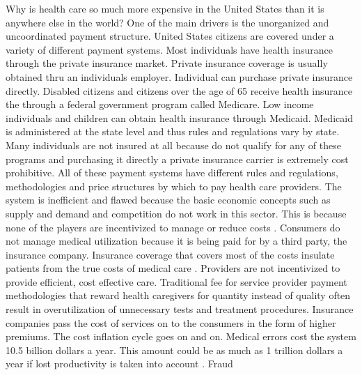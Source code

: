\documentclass[sigconf]{acmart}
\begin{document}
Why is health care so much more expensive in the United States than it is anywhere else in the world?  One of the main drivers is the unorganized and uncoordinated payment structure.  United States citizens are covered under a variety of different payment systems. Most individuals have health insurance through the private insurance market.  Private insurance coverage is usually obtained thru an individuals employer. Individual can purchase private insurance directly.   Disabled citizens and citizens over the age of 65 receive health insurance the through a federal government program called Medicare. Low income individuals and children can obtain health insurance through Medicaid. Medicaid is administered at the state level and thus rules and regulations vary by state.  Many individuals are not insured at all because do not qualify for any of these programs and purchasing it directly a private insurance carrier is extremely cost prohibitive.  All of these payment systems have different rules and regulations, methodologies and price structures by which to pay health care providers.
The system is inefficient and flawed because the basic economic concepts such as supply and demand and competition do not work in this sector. This is because none of the players are incentivized to manage or reduce costs \cite{milbank}.  Consumers do not manage medical utilization because it is being paid for by a third party, the insurance company.  Insurance coverage that covers most of the costs insulate patients from the true costs of medical care \cite{milbank}. Providers are not incentivized to provide efficient, cost effective care.  Traditional fee for service provider payment methodologies that reward health caregivers for quantity instead of quality often result in overutilization of unnecessary tests and treatment procedures.  Insurance companies pass the cost of services on to the consumers in the form of higher premiums. The cost inflation cycle goes on and on.  
Medical errors cost the system 10.5 billion dollars a year. This amount could be as much as 1 trillion dollars a year if lost productivity is taken into account \cite{www-google-pracfuspracfus}.
Fraud
\end{document}
